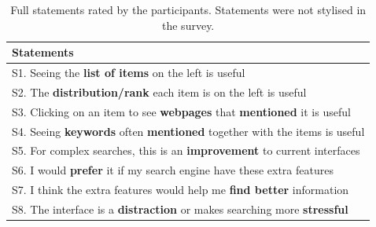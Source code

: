 \begin{table}
\small
    \centering
    \begin{tabular}{l}
    \hline
        Statements \\
        \hline
        
        S1. Seeing the \textbf{list of items} on the left is useful \\
       
        S2. The \textbf{distribution/rank} each item is on the left is useful \\
        
        S3. Clicking on an item to see \textbf{webpages} that \textbf{mentioned} it is useful \\
        
        S4. Seeing \textbf{keywords} often \textbf{mentioned} together with the items is useful \\
        
        S5. For complex searches, this is an \textbf{improvement} to current interfaces \\
        
        S6. I would \textbf{prefer} it if my search engine have these extra features \\
        
        S7. I think the extra features would help me \textbf{find better} information \\
        
        S8. The interface is a \textbf{distraction} or makes searching more \textbf{stressful} \\
        
        \hline
        
    \end{tabular}
    \caption[Full statements rated by the participants.]{Full statements rated by the participants. Statements were not stylised in the survey.}
    \label{tab:statements}
\end{table}



